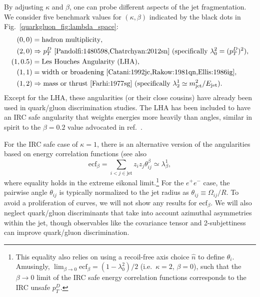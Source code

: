 \documentclass[11pt]{cernrep}
\begin{document}
By adjusting $\kappa$ and $\beta$, one can probe different aspects of the jet fragmentation.  We consider five benchmark values for $(\kappa, \beta)$ indicated by the black dots in Fig.~\ref{quarkgluon_fig:lambda_space}:
\begin{equation}
\label{quarkgluon_eq:benchmarkang}
\begin{aligned}
(0,0) &= \text{hadron multiplicity},\\
(2,0) &\Rightarrow p_T^D \text{  \cite{Pandolfi:1480598,Chatrchyan:2012sn} (specifically $\lambda^{2}_{0} = (p_T^D)^2$)},\\
(1,0.5) & = \text{Les Houches Angularity (LHA)},\\
(1,1) &= \text{width or broadening \cite{Catani:1992jc,Rakow:1981qn,Ellis:1986ig}},\\
(1,2) & \Rightarrow \text{mass or thrust \cite{Farhi:1977sg} (specifically $\lambda^{1}_{2} \simeq m_{\rm jet}^2 / E_{\rm jet}$)}.
\end{aligned}
\end{equation}
Except for the LHA, these angularities (or their close cousins) have already been used in quark/gluon discrimination studies.  The LHA has been included to have an IRC safe angularity that weights energies more heavily than angles, similar in spirit to the $\beta = 0.2$ value advocated in ref.~\cite{Larkoski:2013eya}.

For the IRC safe case of $\kappa = 1$, there is an alternative version
of the angularities based on energy correlation functions \cite{Larkoski:2013eya} (see also \cite{Banfi:2004yd,Jankowiak:2011qa}
\begin{equation}
\text{ecf}_\beta = \sum_{i < j \in \text{jet}} z_i z_j \theta_{ij}^\beta \simeq \lambda^{1}_{\beta},
\end{equation}
where equality holds in the extreme eikonal limit.\footnote{This equality also relies on using a recoil-free axis choice $\hat{n}$ to define $\theta_i$.  Amusingly, $\lim_{\beta \to 0} \text{ecf}_\beta = (1 - \lambda^{2}_{0})/2$ (i.e.~$\kappa = 2$, $\beta = 0$), such that the $\beta \to 0$ limit of the IRC safe energy correlation functions corresponds to the IRC unsafe $p_T^D$.}  For the $e^+ e^-$ case, the pairwise angle $\theta_{ij}$ is typically normalized to the jet radius as $\theta_{ij} \equiv \Omega_{ij}/R$.   To avoid a proliferation of curves, we will not show any results for $\text{ecf}_\beta$.  We will also neglect quark/gluon discriminants that take into account azimuthal asymmetries within the jet, though observables like the covariance tensor \cite{Gallicchio:2012ez} and 2-subjettiness \cite{Thaler:2010tr,Thaler:2011gf} can improve quark/gluon discrimination.
\end{document}
